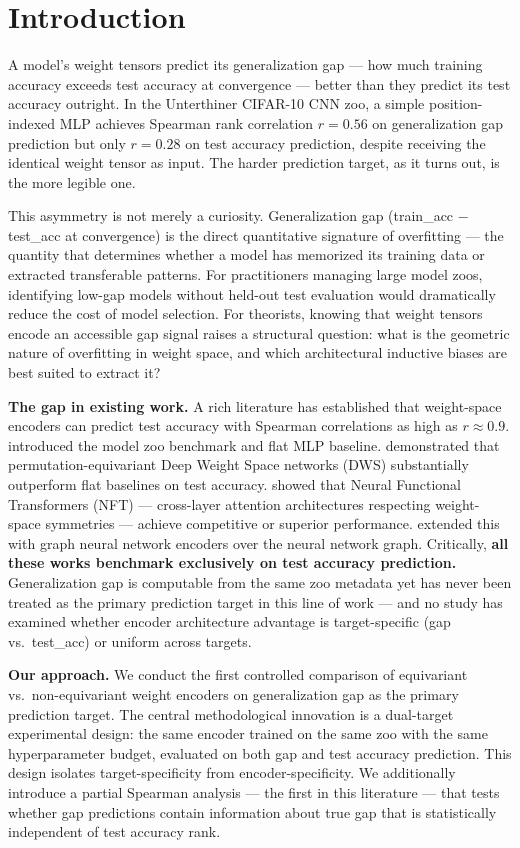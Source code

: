 \section{Introduction}

A model's weight tensors predict its generalization gap --- how much training accuracy exceeds test accuracy
at convergence --- better than they predict its test accuracy outright. In the Unterthiner CIFAR-10 CNN zoo,
a simple position-indexed MLP achieves Spearman rank correlation $r = 0.56$ on generalization gap prediction
but only $r = 0.28$ on test accuracy prediction, despite receiving the identical weight tensor as input.
The harder prediction target, as it turns out, is the more legible one.

This asymmetry is not merely a curiosity. Generalization gap (train\_acc $-$ test\_acc at convergence) is the
direct quantitative signature of overfitting --- the quantity that determines whether a model has memorized
its training data or extracted transferable patterns. For practitioners managing large model zoos, identifying
low-gap models without held-out test evaluation would dramatically reduce the cost of model selection. For
theorists, knowing that weight tensors encode an accessible gap signal raises a structural question: what
is the geometric nature of overfitting in weight space, and which architectural inductive biases are best
suited to extract it?

\textbf{The gap in existing work.} A rich literature has established that weight-space encoders can predict test
accuracy with Spearman correlations as high as $r \approx 0.9$. \citet{unterthiner2020} introduced the model zoo
benchmark and flat MLP baseline. \citet{navon2023} demonstrated that permutation-equivariant Deep Weight
Space networks (DWS) substantially outperform flat baselines on test accuracy. \citet{zhou2023} showed
that Neural Functional Transformers (NFT) --- cross-layer attention architectures respecting weight-space
symmetries --- achieve competitive or superior performance. \citet{kofinas2024} extended this with graph
neural network encoders over the neural network graph. Critically, \textbf{all these works benchmark exclusively
on test accuracy prediction.} Generalization gap is computable from the same zoo metadata yet has never
been treated as the primary prediction target in this line of work --- and no study has examined whether
encoder architecture advantage is target-specific (gap vs.\ test\_acc) or uniform across targets.

\textbf{Our approach.} We conduct the first controlled comparison of equivariant vs.\ non-equivariant weight
encoders on generalization gap as the primary prediction target. The central methodological innovation is
a dual-target experimental design: the same encoder trained on the same zoo with the same hyperparameter
budget, evaluated on both gap and test accuracy prediction. This design isolates target-specificity from
encoder-specificity. We additionally introduce a partial Spearman analysis --- the first in this literature ---
that tests whether gap predictions contain information about true gap that is statistically independent of
test accuracy rank.

